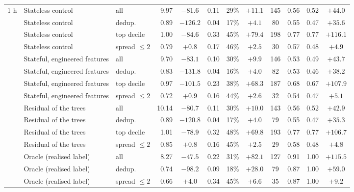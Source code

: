 \begin{table}[p]
\begin{fittable}
\begin{tabular}{lllrcccccccc}
\midrule
1 h & Stateless control & all & 9.97 & $-81.6$ & 0.11 & 29\% & $+11.1$ & 145 & 0.56 & 0.52 & $+44.0$ \\
 & Stateless control & dedup. & 0.89 & $-126.2$ & 0.04 & 17\% & $+4.1$ & 80 & 0.55 & 0.47 & $+35.6$ \\
 & Stateless control & top decile & 1.00 & $-84.6$ & 0.33 & 45\% & $+79.4$ & 198 & 0.77 & 0.77 & $+116.1$ \\
 & Stateless control & spread $\le 2$ & 0.79 & $+0.8$ & 0.17 & 46\% & $+2.5$ & 30 & 0.57 & 0.48 & $+4.9$ \\
 & Stateful, engineered features & all & 9.70 & $-83.1$ & 0.10 & 30\% & $+9.9$ & 146 & 0.53 & 0.49 & $+43.7$ \\
 & Stateful, engineered features & dedup. & 0.83 & $-131.8$ & 0.04 & 16\% & $+4.0$ & 82 & 0.53 & 0.46 & $+38.2$ \\
 & Stateful, engineered features & top decile & 0.97 & $-101.5$ & 0.23 & 38\% & $+68.3$ & 187 & 0.68 & 0.67 & $+107.9$ \\
 & Stateful, engineered features & spread $\le 2$ & 0.72 & $+0.9$ & 0.16 & 44\% & $+2.6$ & 32 & 0.54 & 0.47 & $+5.1$ \\
 & Residual of the trees & all & 10.14 & $-80.7$ & 0.11 & 30\% & $+10.0$ & 143 & 0.56 & 0.52 & $+42.9$ \\
 & Residual of the trees & dedup. & 0.89 & $-120.8$ & 0.04 & 17\% & $+4.0$ & 79 & 0.55 & 0.47 & $+35.3$ \\
 & Residual of the trees & top decile & 1.01 & $-78.9$ & 0.32 & 48\% & $+69.8$ & 193 & 0.77 & 0.77 & $+106.7$ \\
 & Residual of the trees & spread $\le 2$ & 0.85 & $+0.8$ & 0.16 & 45\% & $+2.5$ & 29 & 0.58 & 0.48 & $+4.8$ \\
 & Oracle (realised label) & all & 8.27 & $-47.5$ & 0.22 & 31\% & $+82.1$ & 127 & 0.91 & 1.00 & $+115.5$ \\
 & Oracle (realised label) & dedup. & 0.74 & $-98.2$ & 0.09 & 18\% & $+28.0$ & 79 & 0.87 & 1.00 & $+59.0$ \\
 & Oracle (realised label) & spread $\le 2$ & 0.66 & $+4.0$ & 0.34 & 45\% & $+6.6$ & 35 & 0.87 & 1.00 & $+9.2$ \\
\bottomrule
\end{tabular}\end{fittable}
\end{table}

